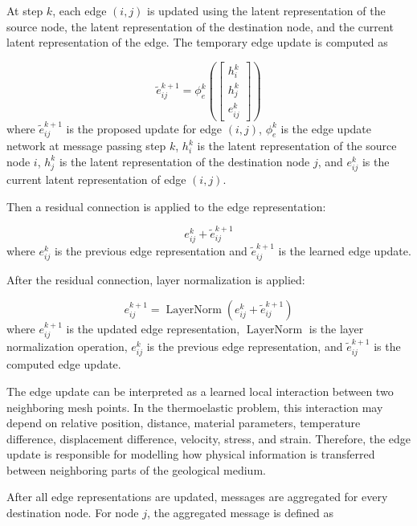 At step \(k\), each edge \((i,j)\) is updated using the latent representation of the source node, the latent representation of the destination node, and the current latent representation of the edge. The temporary edge update is computed as

\begin{equation}
\tilde{e}_{ij}^{k+1}
=
\phi_e^{k}
\left(
\begin{bmatrix}
h_i^k \\
h_j^k \\
e_{ij}^k
\end{bmatrix}
\right)
\end{equation}
where \(\tilde{e}_{ij}^{k+1}\) is the proposed update for edge \((i,j)\), \(\phi_e^{k}\) is the edge update network at message passing step \(k\), \(h_i^k\) is the latent representation of the source node \(i\), \(h_j^k\) is the latent representation of the destination node \(j\), and \(e_{ij}^k\) is the current latent representation of edge \((i,j)\).

Then a residual connection is applied to the edge representation:

\begin{equation}
e_{ij}^{k}
+
\tilde{e}_{ij}^{k+1}
\end{equation}
where \(e_{ij}^{k}\) is the previous edge representation and \(\tilde{e}_{ij}^{k+1}\) is the learned edge update.

After the residual connection, layer normalization is applied:

\begin{equation}
e_{ij}^{k+1}
=
\operatorname{LayerNorm}
\left(
e_{ij}^{k}
+
\tilde{e}_{ij}^{k+1}
\right)
\end{equation}
where \(e_{ij}^{k+1}\) is the updated edge representation, \(\operatorname{LayerNorm}\) is the layer normalization operation, \(e_{ij}^{k}\) is the previous edge representation, and \(\tilde{e}_{ij}^{k+1}\) is the computed edge update.

The edge update can be interpreted as a learned local interaction between two neighboring mesh points. In the thermoelastic problem, this interaction may depend on relative position, distance, material parameters, temperature difference, displacement difference, velocity, stress, and strain. Therefore, the edge update is responsible for modelling how physical information is transferred between neighboring parts of the geological medium.

After all edge representations are updated, messages are aggregated for every destination node. For node \(j\), the aggregated message is defined as


